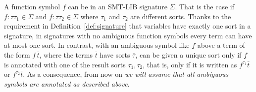 
A function symbol $f$ can be 
in an SMT-LIB signature $\Sigma$.
That is the case if $f:\overline{\tau}\tau_1 \in \Sigma$ and $f:\overline{\tau}\tau_2 \in \Sigma$ 
where $\tau_1$ and $\tau_2$ are different sorts.
Thanks to the requirement in Definition~\ref{def:signature} that
variables have exactly one sort in a signature,
in signatures with no ambiguous function symbols
every term can have at most one sort.
In contrast,
with an ambiguous symbol like $f$ above
a term of the form $f\, \bar{t}$,
where the terms $\bar t$ have sorts $\overline \tau$, can be given 
a unique sort only if $f$ is annotated with one of the result sorts $\tau_1, \tau_2$,
that is, only if it is written as $f^{\tau_1}\bar{t}$ or $f^{\tau_2}\bar{t}$. 
As a consequence, from now on \emph{we will assume 
that all ambiguous symbols are annotated as  described above}.





